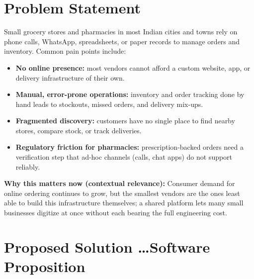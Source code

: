 \documentclass{article}
\begin{document}
\section{Problem Statement}
Small grocery stores and pharmacies in most Indian cities and towns rely on phone calls,
WhatsApp, spreadsheets, or paper records to manage orders and inventory. Common pain points
include:
\begin{itemize}
    \item \textbf{No online presence:} most vendors cannot afford a custom website, app, or
    delivery infrastructure of their own.
    \item \textbf{Manual, error-prone operations:} inventory and order tracking done by hand
    leads to stockouts, missed orders, and delivery mix-ups.
    \item \textbf{Fragmented discovery:} customers have no single place to find nearby stores,
    compare stock, or track deliveries.
    \item \textbf{Regulatory friction for pharmacies:} prescription-backed orders need a
    verification step that ad-hoc channels (calls, chat apps) do not support reliably.
\end{itemize}

\textbf{Why this matters now (contextual relevance):} Consumer demand for online ordering
continues to grow, but the smallest vendors are the ones least able to build this
infrastructure themselves; a shared platform lets many small businesses digitize at once
without each bearing the full engineering cost.

\section{Proposed Solution \dots Software Proposition}
\end{document}
